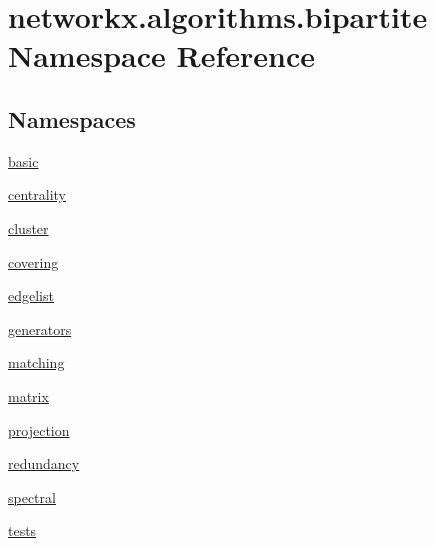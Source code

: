 \hypertarget{namespacenetworkx_1_1algorithms_1_1bipartite}{}\section{networkx.\+algorithms.\+bipartite Namespace Reference}
\label{namespacenetworkx_1_1algorithms_1_1bipartite}
\subsection*{Namespaces}
\begin{DoxyCompactItemize}
\item 
 \hyperlink{namespacenetworkx_1_1algorithms_1_1bipartite_1_1basic}{basic}
\item 
 \hyperlink{namespacenetworkx_1_1algorithms_1_1bipartite_1_1centrality}{centrality}
\item 
 \hyperlink{namespacenetworkx_1_1algorithms_1_1bipartite_1_1cluster}{cluster}
\item 
 \hyperlink{namespacenetworkx_1_1algorithms_1_1bipartite_1_1covering}{covering}
\item 
 \hyperlink{namespacenetworkx_1_1algorithms_1_1bipartite_1_1edgelist}{edgelist}
\item 
 \hyperlink{namespacenetworkx_1_1algorithms_1_1bipartite_1_1generators}{generators}
\item 
 \hyperlink{namespacenetworkx_1_1algorithms_1_1bipartite_1_1matching}{matching}
\item 
 \hyperlink{namespacenetworkx_1_1algorithms_1_1bipartite_1_1matrix}{matrix}
\item 
 \hyperlink{namespacenetworkx_1_1algorithms_1_1bipartite_1_1projection}{projection}
\item 
 \hyperlink{namespacenetworkx_1_1algorithms_1_1bipartite_1_1redundancy}{redundancy}
\item 
 \hyperlink{namespacenetworkx_1_1algorithms_1_1bipartite_1_1spectral}{spectral}
\item 
 \hyperlink{namespacenetworkx_1_1algorithms_1_1bipartite_1_1tests}{tests}
\end{DoxyCompactItemize}


